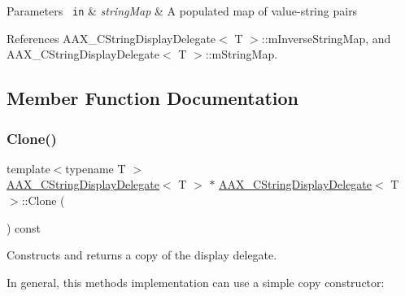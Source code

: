 \begin{DoxyParams}[1]{Parameters}
\mbox{\texttt{ in}}  & {\em string\+Map} & A populated map of value-\/string pairs \\
\hline
\end{DoxyParams}


References A\+A\+X\+\_\+\+C\+String\+Display\+Delegate$<$ T $>$\+::m\+Inverse\+String\+Map, and A\+A\+X\+\_\+\+C\+String\+Display\+Delegate$<$ T $>$\+::m\+String\+Map.



\subsection{Member Function Documentation}
\mbox{\label{a01581_a011fc2e134ffa0469ee995232922bcb2}} 
\subsubsection{\texorpdfstring{Clone()}{Clone()}}
{\footnotesize\ttfamily template$<$typename T $>$ \\
\mbox{\hyperlink{a01581}{A\+A\+X\+\_\+\+C\+String\+Display\+Delegate}}$<$ T $>$ $\ast$ \mbox{\hyperlink{a01581}{A\+A\+X\+\_\+\+C\+String\+Display\+Delegate}}$<$ T $>$\+::Clone (\begin{DoxyParamCaption}{ }\end{DoxyParamCaption}) const\hspace{0.3cm}{\ttfamily [virtual]}}



Constructs and returns a copy of the display delegate. 

In general, this method\textquotesingle{}s implementation can use a simple copy constructor\+:


\begin{DoxyCode}{0}
\DoxyCodeLine{\textcolor{keyword}{}\{}
\DoxyCodeLine{\}}
\end{DoxyCode}
 

